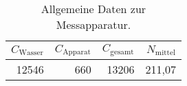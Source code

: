 
\begin{table}[!h]
\begin{center}
\begin{tabular}{|r|r|r|r|}
\hline
$C_\mathrm{Wasser}$ & $C_\mathrm{Apparat}$ & $ C_\mathrm{gesamt}$ & $N_\mathrm{mittel}$\\
\hline
\hline
12546 & 660 & 13206 & 211,07\\
\hline
\end{tabular}
\caption[]{Allgemeine Daten zur Messapparatur.}
\label{allgemein}
\end{center}
\end{table}